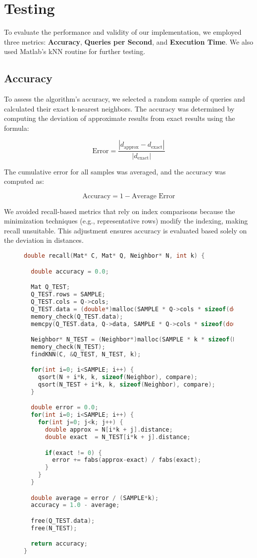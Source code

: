 \documentclass{article}
\begin{document}
\section{Testing}
To evaluate the performance and validity of our implementation, we employed three metrics: \textbf{Accuracy}, \textbf{Queries per Second}, and \textbf{Execution Time}. We also used Matlab's kNN routine for further testing.

\subsection{Accuracy}
To assess the algorithm's accuracy, we selected a random sample of queries and calculated their exact k-nearest neighbors. The accuracy was determined by computing the deviation of approximate results from exact results using the formula:

\[
\text{Error} = \frac{|d_{\text{approx}} - d_{\text{exact}}|}{|d_{\text{exact}}|}
\]

The cumulative error for all samples was averaged, and the accuracy was computed as:

\[
\text{Accuracy} = 1 - \text{Average Error}
\]

We avoided recall-based metrics that rely on index comparisons because the minimization techniques (e.g., representative rows) modify the indexing, making recall unsuitable. This adjustment ensures accuracy is evaluated based solely on the deviation in distances.

\begin{figure}[H]
\begin{lstlisting}[language=C, caption={Routine for Calculating Accuracy}]
double recall(Mat* C, Mat* Q, Neighbor* N, int k) {

  double accuracy = 0.0;

  Mat Q_TEST;
  Q_TEST.rows = SAMPLE;
  Q_TEST.cols = Q->cols;
  Q_TEST.data = (double*)malloc(SAMPLE * Q->cols * sizeof(double));
  memory_check(Q_TEST.data);
  memcpy(Q_TEST.data, Q->data, SAMPLE * Q->cols * sizeof(double));

  Neighbor* N_TEST = (Neighbor*)malloc(SAMPLE * k * sizeof(Neighbor));
  memory_check(N_TEST);
  findKNN(C, &Q_TEST, N_TEST, k);

  for(int i=0; i<SAMPLE; i++) {
    qsort(N + i*k, k, sizeof(Neighbor), compare);
    qsort(N_TEST + i*k, k, sizeof(Neighbor), compare);
  }

  double error = 0.0;
  for(int i=0; i<SAMPLE; i++) {
    for(int j=0; j<k; j++) {
      double approx = N[i*k + j].distance;
      double exact  = N_TEST[i*k + j].distance;

      if(exact != 0) {
        error += fabs(approx-exact) / fabs(exact);
      }
    }
  }

  double average = error / (SAMPLE*k);
  accuracy = 1.0 - average;

  free(Q_TEST.data);
  free(N_TEST);

  return accuracy;
}
\end{lstlisting}
\end{figure}
\end{document}
